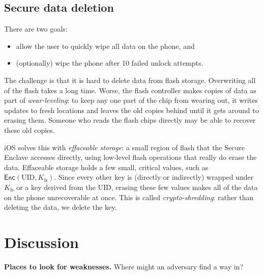 \documentclass[
  letterpaper,
]{scrbook}
\providecommand{\tightlist}{%
  \setlength{\itemsep}{0pt}\setlength{\parskip}{0pt}}
\theoremstyle{definition}
\theoremstyle{plain}
\theoremstyle{plain}
\theoremstyle{remark}
\begin{document}
\subsection{Secure data deletion}\label{sec-ios-delete}

There are two goals:

\begin{itemize}
\tightlist
\item
  allow the user to quickly wipe all data on the phone, and
\item
  (optionally) wipe the phone after 10 failed unlock attempts.
\end{itemize}

The challenge is that it is hard to delete data from flash storage.
Overwriting all of the flash takes a long time. Worse, the flash
controller makes copies of data as part of \emph{wear-leveling}: to keep
any one part of the chip from wearing out, it writes updates to fresh
locations and leaves the old copies behind until it gets around to
erasing them. Someone who reads the flash chips directly may be able to
recover these old copies.

iOS solves this with \emph{effaceable storage}: a small region of flash
that the Secure Enclave accesses directly, using low-level flash
operations that really do erase the data. Effaceable storage holds a few
small, critical values, such as
\(\mathsf{Enc}(\text{UID}, K_\text{fs})\). Since every other key is
(directly or indirectly) wrapped under \(K_\text{fs}\) or a key derived
from the UID, erasing these few values makes all of the data on the
phone unrecoverable at once. This is called \emph{crypto-shredding}:
rather than deleting the data, we delete the key.

\section{Discussion}\label{discussion-1}

\textbf{Places to look for weaknesses.} Where might an adversary find a
way in?
\end{document}
